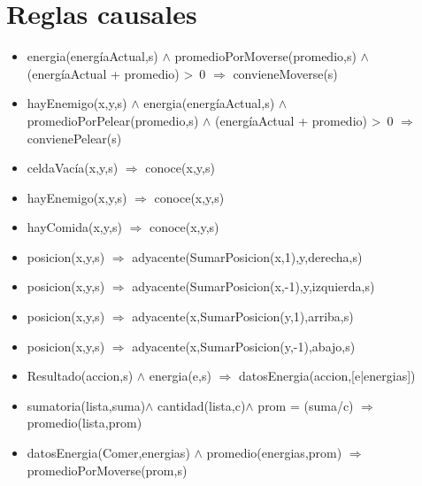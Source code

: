 \section{Reglas causales}

\begin{itemize}

\item  energia(energíaActual,s)
$\land$ promedioPorMoverse(promedio,s) $\land$ (energíaActual + promedio) >~0
$\Rightarrow$ convieneMoverse(s)

\item hayEnemigo(x,y,s) $\land$ energia(energíaActual,s)
$\land$ promedioPorPelear(promedio,s) $\land$ (energíaActual + promedio) >~0
$\Rightarrow$ convienePelear(s)

\item celdaVacía(x,y,s) $\Rightarrow$
 conoce(x,y,s)
 
\item hayEnemigo(x,y,s) $\Rightarrow$
 conoce(x,y,s)

\item hayComida(x,y,s) $\Rightarrow$
 conoce(x,y,s)

\item posicion(x,y,s) $\Rightarrow$ adyacente(SumarPosicion(x,1),y,derecha,s)

\item posicion(x,y,s) $\Rightarrow$ adyacente(SumarPosicion(x,-1),y,izquierda,s)

\item posicion(x,y,s) $\Rightarrow$ adyacente(x,SumarPosicion(y,1),arriba,s)

\item posicion(x,y,s) $\Rightarrow$ adyacente(x,SumarPosicion(y,-1),abajo,s)

\item Resultado(accion,s) $\land$ energia(e,s) 
$\Rightarrow$
     datosEnergia(accion,[e|energias])
     
\item sumatoria(lista,suma)$\land$ cantidad(lista,c)$\land$ prom = (suma/c)
\newline
       $\Rightarrow$ promedio(lista,prom)

\item  datosEnergia(Comer,energias) $\land$ 
 promedio(energias,prom) $\Rightarrow$
 promedioPorMoverse(prom,s)
       

\end{itemize}
